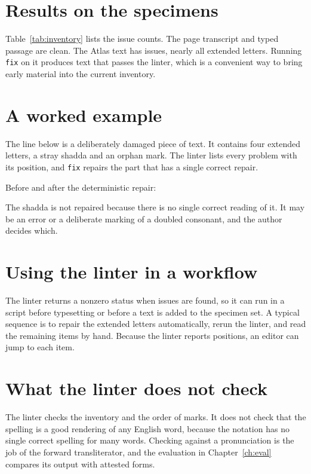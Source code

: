 \section{Results on the specimens}
Table~\ref{tab:inventory} lists the issue counts. The page transcript and typed passage are clean. The Atlas text has \AtlasExtended{} issues, nearly all extended letters. Running \texttt{fix} on it produces text that passes the linter, which is a convenient way to bring early material into the current inventory.

\section{A worked example}
The line below is a deliberately damaged piece of text. It contains four extended letters, a stray shadda and an orphan mark. The linter lists every problem with its position, and \texttt{fix} repairs the part that has a single correct repair.

\begin{table}[ht]\centering\small

\caption{Linter output for a damaged line.}\label{tab:lintdemo}
\end{table}

Before and after the deterministic repair:
\begin{quote}\noindent

\end{quote}
The shadda is not repaired because there is no single correct reading of it. It may be an error or a deliberate marking of a doubled consonant, and the author decides which.

\section{Using the linter in a workflow}
The linter returns a nonzero status when issues are found, so it can run in a script before typesetting or before a text is added to the specimen set. A typical sequence is to repair the extended letters automatically, rerun the linter, and read the remaining items by hand. Because the linter reports positions, an editor can jump to each item.

\section{What the linter does not check}
The linter checks the inventory and the order of marks. It does not check that the spelling is a good rendering of any English word, because the notation has no single correct spelling for many words. Checking against a pronunciation is the job of the forward transliterator, and the evaluation in Chapter~\ref{ch:eval} compares its output with attested forms.
